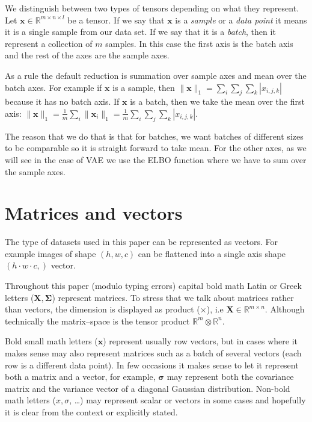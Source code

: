 \documentclass[11pt, a4paper]{report}
\theoremstyle{plain}
\theoremstyle{definition}
\theoremstyle{remark}
\newcommand{\R}{\mathbb{R}}
\newcommand{\x}{\mathbf{x}}
\newcommand{\bv}[1]{\boldsymbol{#1}}
\begin{document}
We distinguish between two types of tensors depending on what they represent.
Let $\x \in \R^{m \times n \times l}$ be a tensor. If we say that $\x$ is a
\emph{sample} or a \emph{data point} it means it is a single sample from our
data set. If we say that it is a \emph{batch}, then it represent a collection of
$m$ samples. In this case the first axis is the batch axis and the rest of the
axes are the sample axes.

As a rule the default reduction is summation over sample axes and mean over the
batch axes. For example if $\x$ is a sample, then $\|\x \|_1 = \sum_i \sum_j
\sum_k |x_{i,j,k}|$ because it has no batch axis. If $\x$ is a batch, then we
take the mean over the first axis: $\| \x \|_1 = \frac{1}{m} \sum_i \| \x_i \|_1
= \frac{1}{m} \sum_i \sum_j \sum_k |x_{i,j,k}|$.

The reason that we do that is that for batches, we want batches of different
sizes to be comparable so it is straight forward to take mean. For the other
axes, as we will see in the case of VAE we use the ELBO function where we have
to sum over the sample axes.

\label{meansumrule}


\section{Matrices and vectors}

The type of datasets used in this paper can be represented as vectors. For
example images of shape $(h,w,c)$ can be flattened into a single axis shape $(h
\cdot w \cdot c,)$ vector.

Throughout this paper (modulo typing errors) capital bold math Latin or
Greek letters ($\bv{X, \Sigma}$) represent matrices. To stress that we talk
about matrices rather than vectors, the dimension is displayed as product ($\times$),
i.e $\bv{X} \in \R^{m \times n}$. Although technically the matrix--space is the
tensor product $\R^m \otimes \R^n$.

Bold small math letters ($\bv{x}$) represent usually row vectors, but in cases
where it makes sense may also represent matrices such as a batch of several
vectors (each row is a different data point). In few occasions it makes sense to
let it represent both a matrix and a vector, for example, $\bv{\sigma}$ may
represent both the covariance matrix and the variance vector of a diagonal
Gaussian distribution. Non-bold math letters ($x, \sigma$, \dots) may represent
scalar or vectors in some cases and hopefully it is clear from the context or
explicitly stated.
\end{document}
